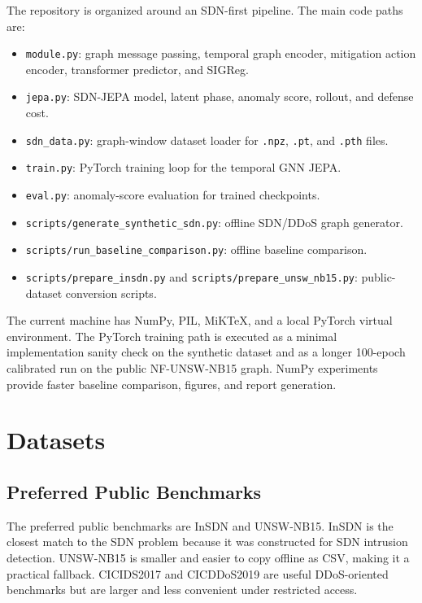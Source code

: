 \documentclass[runningheads]{llncs}
\begin{document}
The repository is organized around an SDN-first pipeline. The main code paths
are:
\begin{itemize}
  \item \texttt{module.py}: graph message passing, temporal graph encoder,
  mitigation action encoder, transformer predictor, and SIGReg.
  \item \texttt{jepa.py}: SDN-JEPA model, latent phase, anomaly score, rollout,
  and defense cost.
  \item \texttt{sdn\_data.py}: graph-window dataset loader for \texttt{.npz},
  \texttt{.pt}, and \texttt{.pth} files.
  \item \texttt{train.py}: PyTorch training loop for the temporal GNN JEPA.
  \item \texttt{eval.py}: anomaly-score evaluation for trained checkpoints.
  \item \texttt{scripts/generate\_synthetic\_sdn.py}: offline SDN/DDoS graph
  generator.
  \item \texttt{scripts/run\_baseline\_comparison.py}: offline baseline
  comparison.
  \item \texttt{scripts/prepare\_insdn.py} and
  \texttt{scripts/prepare\_unsw\_nb15.py}: public-dataset conversion scripts.
\end{itemize}

The current machine has NumPy, PIL, MiKTeX, and a local PyTorch virtual
environment. The PyTorch training path is executed as a minimal implementation
sanity check on the synthetic dataset and as a longer 100-epoch calibrated run
on the public NF-UNSW-NB15 graph. NumPy experiments provide faster baseline
comparison, figures, and report generation.

\section{Datasets}

\subsection{Preferred Public Benchmarks}

The preferred public benchmarks are InSDN and UNSW-NB15. InSDN is the closest
match to the SDN problem because it was constructed for SDN intrusion
detection. UNSW-NB15 is smaller and easier to copy offline as CSV, making it a
practical fallback. CICIDS2017 and CICDDoS2019 are useful DDoS-oriented
benchmarks but are larger and less convenient under restricted access.
\end{document}
